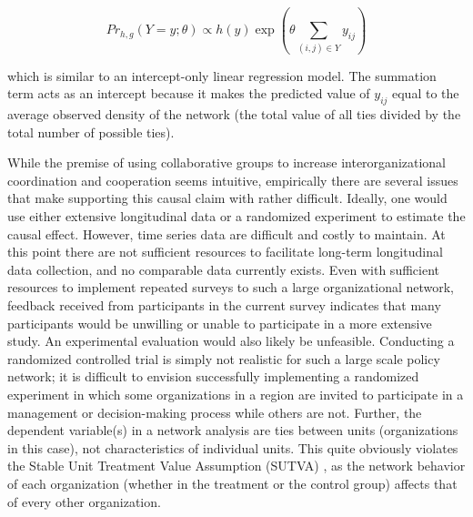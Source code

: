 \documentclass[12pt,a4paper,titlepage]{article}
\begin{document}
\begin{equation}
Pr_{h,g} (Y = y; \theta) \propto h(y) \exp(\theta \sum_{(i,j) \in Y} y_{ij})
\label{eq:Term}
\end{equation}

which is similar to an intercept-only linear regression model. The summation term acts as an intercept because it makes the predicted value of $y_{ij}$ equal to the average observed density of the network (the total value of all ties divided by the total number of possible ties).

While the premise of using collaborative groups to increase interorganizational coordination and cooperation seems intuitive, empirically there are several issues that make supporting this causal claim with rather difficult. Ideally, one would use either extensive longitudinal data or a randomized experiment to estimate the causal effect. However, time series data are difficult and costly to maintain. At this point there are not sufficient resources to facilitate long-term longitudinal data collection, and no comparable data currently exists. Even with sufficient resources to implement repeated surveys to such a large organizational network, feedback received from participants in the current survey indicates that many participants would be unwilling or unable to participate in a more extensive study. An experimental evaluation would also likely be unfeasible. Conducting a randomized controlled trial is simply not realistic for such a large scale policy network; it is difficult to envision successfully implementing a randomized experiment in which some organizations in a region are invited to participate in a management or decision-making process while others are not. Further, the dependent variable(s) in a network analysis are ties between units (organizations in this case), not characteristics of individual units. This quite obviously violates the Stable Unit Treatment Value Assumption (SUTVA) \parencite{rubin1986, pearl2000}, as the network behavior of each organization (whether in the treatment or the control group) affects that of every other organization.
\end{document}
